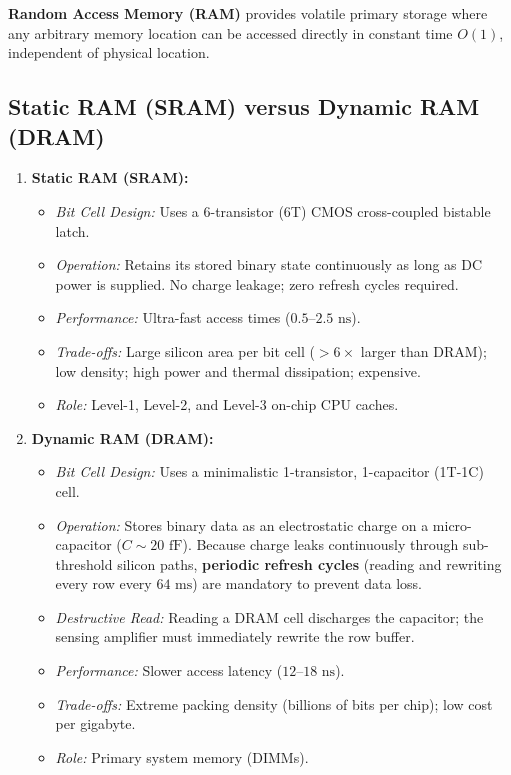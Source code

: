 \textbf{Random Access Memory (RAM)} provides volatile primary storage where any arbitrary memory location can be accessed directly in constant time $O(1)$, independent of physical location.

\subsection{Static RAM (SRAM) versus Dynamic RAM (DRAM)}
\begin{enumerate}[label=\bfseries\arabic*.]
    \item \textbf{Static RAM (SRAM):}
    \begin{itemize}
        \item \textit{Bit Cell Design:} Uses a 6-transistor (6T) CMOS cross-coupled bistable latch.
        \item \textit{Operation:} Retains its stored binary state continuously as long as DC power is supplied. No charge leakage; zero refresh cycles required.
        \item \textit{Performance:} Ultra-fast access times ($0.5$--$2.5\text{ ns}$).
        \item \textit{Trade-offs:} Large silicon area per bit cell ($>6\times$ larger than DRAM); low density; high power and thermal dissipation; expensive.
        \item \textit{Role:} Level-1, Level-2, and Level-3 on-chip CPU caches.
    \end{itemize}
    \item \textbf{Dynamic RAM (DRAM):}
    \begin{itemize}
        \item \textit{Bit Cell Design:} Uses a minimalistic 1-transistor, 1-capacitor (1T-1C) cell.
        \item \textit{Operation:} Stores binary data as an electrostatic charge on a micro-capacitor ($C \sim 20\text{ fF}$). Because charge leaks continuously through sub-threshold silicon paths, \textbf{periodic refresh cycles} (reading and rewriting every row every $64\text{ ms}$) are mandatory to prevent data loss.
        \item \textit{Destructive Read:} Reading a DRAM cell discharges the capacitor; the sensing amplifier must immediately rewrite the row buffer.
        \item \textit{Performance:} Slower access latency ($12$--$18\text{ ns}$).
        \item \textit{Trade-offs:} Extreme packing density (billions of bits per chip); low cost per gigabyte.
        \item \textit{Role:} Primary system memory (DIMMs).
    \end{itemize}
\end{enumerate}

